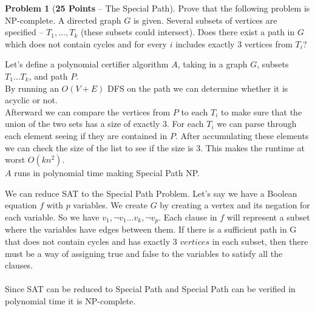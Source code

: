 \documentclass[11pt]{article}
\theoremstyle{definition}
\theoremstyle{theorem}
\newtheorem{prob}{Problem}
\begin{document}
\clearpage
\begin{prob}[\textbf{25 Points} -- The Special Path]
    Prove that the following problem is NP-complete. A  directed graph  $G$ is  given.  Several subsets  of vertices  are specified –  $T_1, \dots, T_k$  (these subsets could  intersect). Does there exist a path in $G$ which does not contain cycles and for every $i$ includes exactly $3$ vertices from $T_i$?
\end{prob}

Let's define a polynomial certifier algorithm $A$, taking in a graph $G$, subsets $T_{1} \ldots T_{k}$, and path $P$. \\
By running an $O(V + E)$ DFS on the path we can determine whether it is acyclic or not. \\
Afterward we can compare the vertices from $P$ to each $T_{i}$ to make sure that the union of the two sets has a size of exactly $3$. For each $T_{i}$ we can parse through each element seeing if they are contained in $P$. After accumulating these elements we can check the size of the list to see if the size is $3$. This makes the runtime at worst $O(kn^2)$. \\
$A$ runs in polynomial time making Special Path NP.

We can reduce SAT to the Special Path Problem. Let's say we have a Boolean equation $f$ with $p$ variables. We create $G$ by creating a vertex and its negation for each variable. So we have $v_{1}, \lnot v_{1} \ldots v_{k}, \lnot v_{p}$. Each clause in $f$ will represent a subset where the variables have edges between them. If there is a sufficient path in G that does not contain cycles and has exactly 3 $vertices$ in each subset, then there must be a way of assigning true and false to the variables to satisfy all the clauses. \\\\
Since SAT can be reduced to Special Path and Special Path can be verified in polynomial time it is NP-complete.
\end{document}
